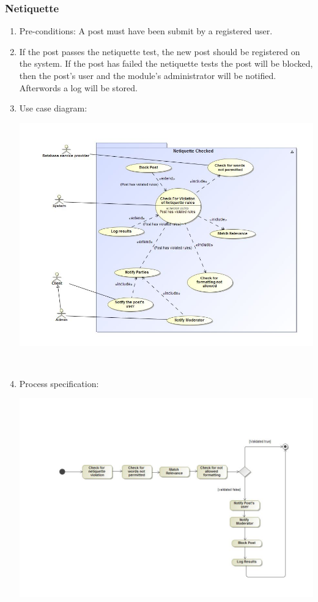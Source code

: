 \documentclass[hidelinks, 12pt, oneside]{article}
\begin{document}
\subsubsection{Netiquette}
\begin{enumerate}
 \item Pre-conditions: A post must have been submit by a registered user.

 \item If the post passes the netiquette test, the new post should be registered on the system. If the post has failed the netiquette tests the post will be blocked, then the post's user and the module's administrator will be notified. Afterwords a log will be stored.  

 \item Use case diagram:\\
  \centerline{\includegraphics[scale=0.4]{netiquetteUseCase}}\\
  \item Process specification:\\
 \centerline{\includegraphics[scale=0.35]{NetiquetteActivityDiagram}} 
\end{enumerate}
\end{document}
